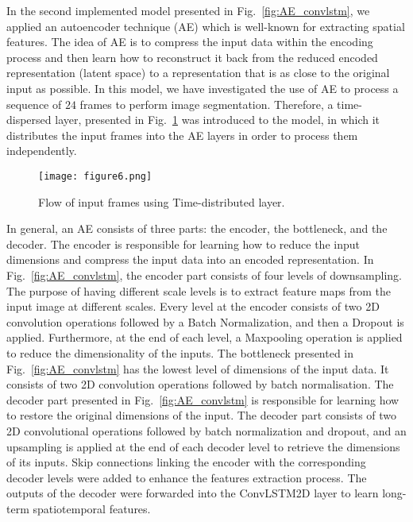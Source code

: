In the second implemented model presented in Fig.~\ref{fig:AE_convlstm}, we applied an autoencoder technique (AE) which is well-known for extracting spatial features.
The idea of AE is to compress the input data within the encoding process and then learn how to reconstruct it back from the reduced encoded representation (latent space) to a representation that is as close to the original input as possible. 
In this model, we have investigated the use of AE to process a sequence of \(24\) frames to perform image segmentation.
Therefore, a time-dispersed layer, presented in Fig.~\ref{fig:TD} was introduced to the model, in which it distributes the input frames into the AE layers in order to process them independently.
\begin{figure}[!h]
	\centering
	\texttt{[image: figure6.png]}
	\caption{Flow of input frames using Time-distributed layer.}
	\label{fig:TD}
\end{figure}

In general, an AE consists of three parts: the encoder, the bottleneck, and the decoder.
The encoder is responsible for learning how to reduce the input dimensions and compress the input data into an encoded representation.
In Fig.~\ref{fig:AE_convlstm}, the encoder part consists of four levels of downsampling. 
The purpose of having different scale levels is to extract feature maps from the input image at different scales.
Every level at the encoder consists of two 2D convolution operations followed by a Batch Normalization, and then a Dropout is applied.
Furthermore, at the end of each level, a Maxpooling operation is applied to reduce the dimensionality of the inputs. 
The bottleneck presented in Fig.~\ref{fig:AE_convlstm} has the lowest level of dimensions of the input data.
It consists of two 2D convolution operations followed by batch normalisation.
The decoder part presented in Fig.~\ref{fig:AE_convlstm} is responsible for learning how to restore the original dimensions of the input.
The decoder part consists of two 2D convolutional operations followed by batch normalization and dropout, and an upsampling is applied at the end of each decoder level to retrieve the dimensions of its inputs.
Skip connections linking the encoder with the corresponding decoder levels were added to enhance the features extraction process.
The outputs of the decoder were forwarded into the ConvLSTM2D layer to learn long-term spatiotemporal features.

